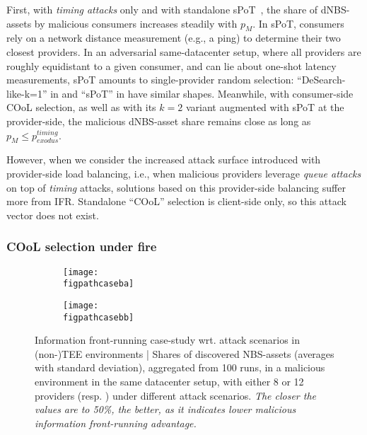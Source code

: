 First, with \emph{timing attacks} only and with standalone sPoT~\cite{panigrahyAnalysisEvaluationProximitybased2022}, the share of dNBS-assets by malicious consumers increases steadily with $p_{M}$.
In sPoT, consumers rely on a network distance measurement (e.g., a ping) to determine their two closest providers.
In an adversarial same-datacenter setup, where all providers are roughly equidistant to a given consumer, and can lie about one-shot latency measurements, sPoT amounts to single-provider random selection: ``DeSearch-like-k=1'' in  and ``sPoT'' in  have similar shapes.  
Meanwhile, with consumer-side COoL selection, as well as with its $k=2$ variant augmented with sPoT at the provider-side, the malicious dNBS-asset share remains close as long as $p_{M}\leq p_{exodus}^{timing}$.

However, when we consider the increased attack surface introduced with provider-side load balancing, i.e., 
when malicious providers leverage \emph{queue attacks} on top of \emph{timing} attacks, solutions based on this provider-side balancing suffer more from IFR.
Standalone ``COoL'' selection is client-side only, so this attack vector does not exist.

\subsubsection{COoL selection under fire}\label{ssec:cs3}

\begin{figure*}
    \centering
    \begin{subfigure}{0.49\linewidth}
        \centering
        \texttt{[image: \\figpathcaseba]}
        \label{fig:byz-sameDC-cs-8sp}
    \end{subfigure}
    \begin{subfigure}{0.49\linewidth}
        \centering
        \texttt{[image: \\figpathcasebb]}
        \label{fig:byz-sameDC-cs-12sp}
    \end{subfigure}
    \caption{Information front-running case-study wrt. attack scenarios in (non-)TEE environments | 
    Shares of discovered NBS-assets (averages with standard deviation), aggregated from 100 runs, in a malicious environment in the same datacenter setup, with either 8 or 12 providers (resp. ) under different attack scenarios.
    \emph{The closer the values are to 50\%, the better, as it indicates lower malicious information front-running advantage.}
    }
    \label{fig:byz-sameDC-cs-att}
\end{figure*}

